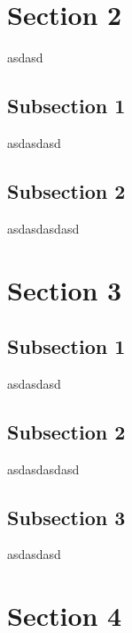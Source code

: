 \section{Section 2}
asdasd

\subsection{Subsection 1}
asdasdasd

\subsection{Subsection 2}
asdasdasdasd

\section{Section 3}

\subsection{Subsection 1}
asdasdasd

\subsection{Subsection 2}
asdasdasdasd

\subsection{Subsection 3}
asdasdasd

\section{Section 4}

